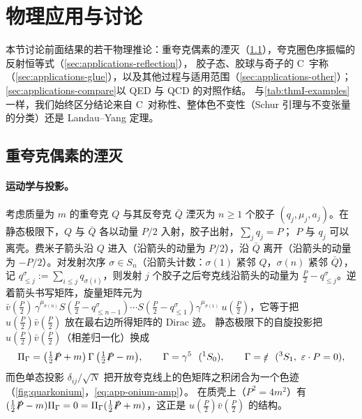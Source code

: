 \documentclass[UTF8,a4paper,11pt,fontset=fandol]{ctexart}
\theoremstyle{cplain}
\theoremstyle{cdefinition}
\theoremstyle{cremark}
\numberwithin{equation}{section}
\newcommand{\sla}[1]{\slashed{#1}}                  %
\begin{document}
\section{物理应用与讨论}\label{sec:applications}

本节讨论前面结果的若干物理推论：重夸克偶素的湮灭（\cref{sec:applications-quarkonium}），夸克圈色序振幅的反射恒等式（\cref{sec:applications-reflection}），
胶子态、胶球与奇子的 C~宇称（\cref{sec:applications-glue}），以及其他过程与适用范围（\cref{sec:applications-other}）；\cref{sec:applications-compare}以 QED 与 QCD 的对照作结。
与\cref{tab:thmI-examples}一样，我们始终区分结论来自 C~对称性、整体色不变性（Schur 引理与不变张量的分类）还是 Landau--Yang 定理。

\subsection{重夸克偶素的湮灭}\label{sec:applications-quarkonium}

\paragraph{运动学与投影。}
考虑质量为 $m$ 的重夸克 $Q$ 与其反夸克 $\bar Q$ 湮灭为 $n\ge1$ 个胶子 $(q_j,\mu_j,a_j)$。在静态极限下，$Q$ 与 $\bar Q$ 各以动量 $P/2$ 入射，胶子出射，$\sum_jq_j=P$；
$P$ 与 $q_j$ 可以离壳。费米子箭头沿 $Q$ 进入（沿箭头的动量为 $P/2$），沿 $\bar Q$ 离开（沿箭头的动量为 $-P/2$）。对发射次序 $\sigma\in S_n$（沿箭头计数：$\sigma(1)$ 紧邻 $Q$，$\sigma(n)$ 紧邻 $\bar Q$），
记 $q^\sigma_{\le j}:=\sum_{i\le j}q_{\sigma(i)}$，则发射 $j$ 个胶子之后夸克线沿箭头的动量为 $\frac P2-q^\sigma_{\le j}$。逆着箭头书写矩阵，旋量矩阵元为
$\bar v(\tfrac P2)\,\gamma^{\mu_{\sigma(n)}}S(\tfrac P2-q^\sigma_{\le n-1})\cdots S(\tfrac P2-q^\sigma_{\le1})\gamma^{\mu_{\sigma(1)}}\,u(\tfrac P2)$，它等于把 $u(\frac P2)\bar v(\frac P2)$ 放在最右边所得矩阵的 Dirac 迹。
静态极限下的自旋投影把 $u(\frac P2)\bar v(\frac P2)$（相差归一化）换成
\begin{equation}\label{eq:app-onium-proj}
\Pi_\Gamma=\bigl(\tfrac12\sla P+m\bigr)\,\Gamma\,\bigl(\tfrac12\sla P-m\bigr),\qquad \Gamma=\gamma^5\ \ ({}^1S_0),\qquad \Gamma=\sla\varepsilon\ \ ({}^3S_1,\ \varepsilon\cdot P=0),
\end{equation}
而色单态投影 $\delta_{ij}/\sqrt N$ 把开放夸克线上的色矩阵之积闭合为一个色迹（\cref{fig:quarkonium}，\cref{eq:app-onium-amp}）。
在质壳上（$P^2=4m^2$）有 $(\frac12\sla P-m)\Pi_\Gamma=0=\Pi_\Gamma(\frac12\sla P+m)$，这正是 $u(\frac P2)\bar v(\frac P2)$ 的结构。
\end{document}
